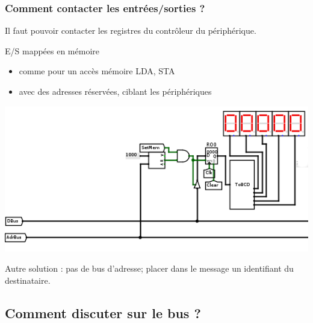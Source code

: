 \documentclass{beamer}
\begin{document}
\begin{frame}
\frametitle{Comment contacter les entrées/sorties ?}

Il faut pouvoir contacter les registres du contrôleur du périphérique.

\begin{block}{E/S mappées en mémoire}

\begin{itemize}
\item comme pour un accès mémoire LDA, STA
\item avec des adresses réservées, ciblant les périphériques
\end{itemize}

\centering\includegraphics[width=0.5\linewidth]{Figs/io_mapped.png}

\end{block}

Autre solution : pas de bus d'adresse; placer dans le message un identifiant du destinataire.

\end{frame}









\subsection{Comment discuter sur le bus ?}
\end{document}
